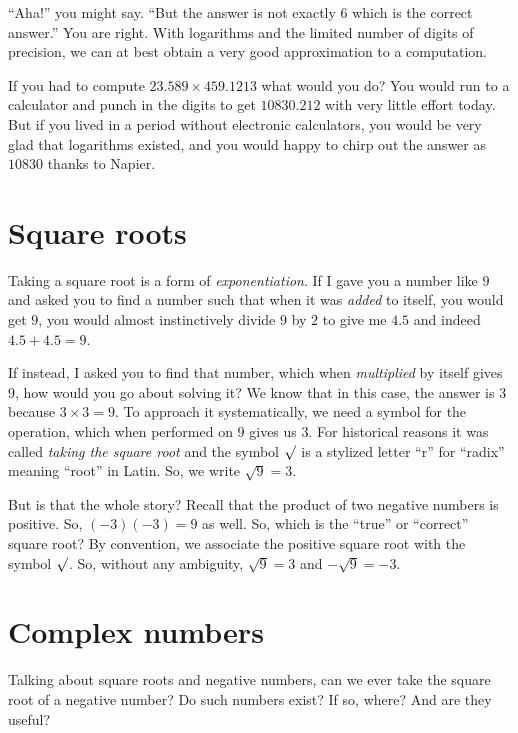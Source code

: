 \documentclass[
  a4paper,
]{article}
\begin{document}
``Aha!'' you might say. ``But the answer is not exactly \(6\) which is
the correct answer.'' You are right. With logarithms and the limited
number of digits of precision, we can at best obtain a very good
approximation to a computation.

If you had to compute \(23.589 \times 459.1213\) what would you do? You
would run to a calculator and punch in the digits to get \(10830.212\)
with very little effort today. But if you lived in a period without
electronic calculators, you would be very glad that logarithms existed,
and you would happy to chirp out the answer as \(10830\) thanks to
Napier.

\hypertarget{square-roots}{%
\section{Square roots}\label{square-roots}}

Taking a square root is a form of \emph{exponentiation}. If I gave you a
number like \(9\) and asked you to find a number such that when it was
\emph{added} to itself, you would get \(9\), you would almost
instinctively divide \(9\) by \(2\) to give me \(4.5\) and indeed
\(4.5 + 4.5 = 9\).

If instead, I asked you to find that number, which when
\emph{multiplied} by itself gives \(9\), how would you go about solving
it? We know that in this case, the answer is \(3\) because
\(3 \times 3 = 9\). To approach it systematically, we need a symbol for
the operation, which when performed on \(9\) gives us \(3\). For
historical reasons it was called \emph{taking the square root} and the
symbol \(\surd\) is a stylized letter ``r'' for ``radix'' meaning
``root'' in Latin. So, we write \(\sqrt{9} = 3\).

But is that the whole story? Recall that the product of two negative
numbers is positive. So, \((-3)(-3) = 9\) as well. So, which is the
``true'' or ``correct'' square root? By convention, we associate the
positive square root with the symbol \(\surd\). So, without any
ambiguity, \(\sqrt{9} = 3\) and \(-\sqrt{9} = -3\).

\hypertarget{complex-numbers}{%
\section{Complex numbers}\label{complex-numbers}}

Talking about square roots and negative numbers, can we ever take the
square root of a negative number? Do such numbers exist? If so, where?
And are they useful?
\end{document}
